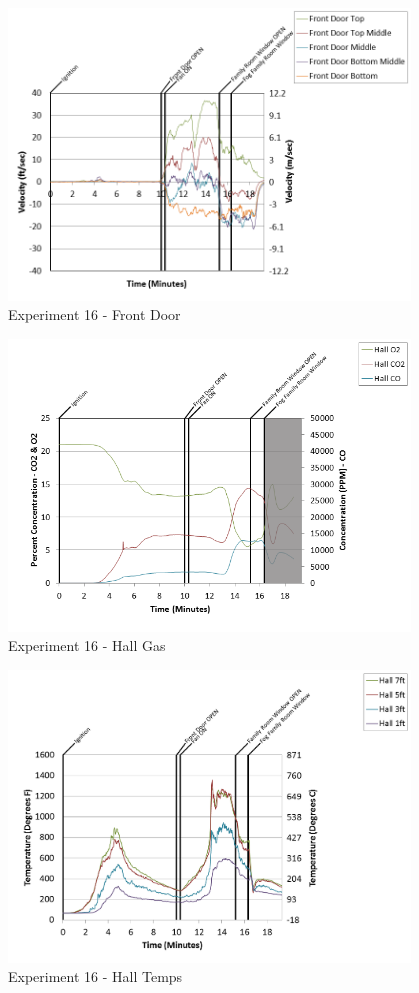 \documentclass{article}
\begin{document}
\begin{appendices}
\clearpage

\begin{figure}[h!]
	\centering
	\includegraphics[height=3.05in]{0_Images/Results_Charts/Exp_16_Charts/FrontDoor.png}
	\caption{Experiment 16 - Front Door}
\end{figure}


\begin{figure}[h!]
	\centering
	\includegraphics[height=3.05in]{0_Images/Results_Charts/Exp_16_Charts/HallGas.png}
	\caption{Experiment 16 - Hall Gas}
\end{figure}

\clearpage

\begin{figure}[h!]
	\centering
	\includegraphics[height=3.05in]{0_Images/Results_Charts/Exp_16_Charts/HallTemps.png}
	\caption{Experiment 16 - Hall Temps}
\end{figure}



\end{appendices}
\end{document}
